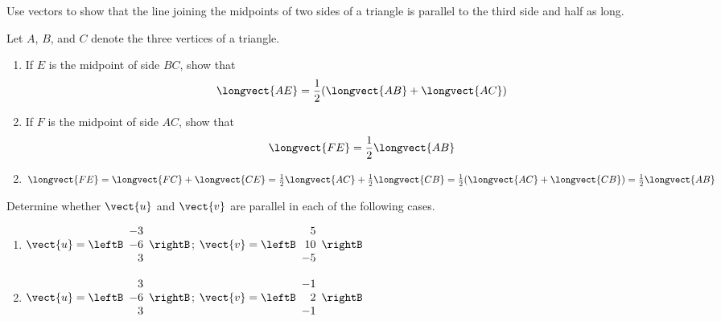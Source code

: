 \begin{multicols}{2}
\begin{ex}
Use
 vectors to show that the line joining the midpoints of two sides of a 
triangle is parallel to the third side and half as long.
\end{ex}

\begin{ex}
Let $A$, $B$, and $C$ denote the three vertices of a triangle.


\begin{enumerate}[label={\alph*.}]
\item If $E$ is the midpoint of side $BC$, show that
\begin{equation*}
\longvect{AE} = \frac{1}{2}(\longvect{AB} + \longvect{AC})
\end{equation*}
\item If $F$ is the midpoint of side $AC$, show that
\begin{equation*}
\longvect{FE} = \frac{1}{2}\longvect{AB}
\end{equation*}
\end{enumerate}
\begin{sol}
\begin{enumerate}[label={\alph*.}]
\setcounter{enumi}{1}
\item 
$\longvect{FE} = \longvect{FC} + \longvect{CE} = \frac{1}{2}\longvect{AC} + \frac{1}{2}\longvect{CB} = \frac{1}{2}(\longvect{AC} + \longvect{CB}) = \frac{1}{2}\longvect{AB}$ 

\end{enumerate}
\end{sol}
\end{ex}

\begin{ex}
Determine whether $\vect{u}$ and $\vect{v}$ are parallel in each of the following cases.

\begin{enumerate}[label={\alph*.}]
\item 
$\vect{u} = \leftB
\begin{array}{r}
-3\\
-6\\
3
\end{array}
\rightB$;  
$\vect{v} = \leftB
\begin{array}{r}
5\\
10 \\
-5
\end{array}
\rightB$

\item 
$\vect{u} = \leftB
\begin{array}{r}
3\\
-6\\
3
\end{array}
\rightB$;
$\vect{v} = \leftB
\begin{array}{r}
-1\\
2 \\
-1
\end{array}
\rightB$



\end{enumerate}
\end{ex}
\end{multicols}
